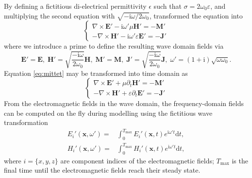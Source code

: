 \documentclass[a4paper,10pt]{article}
\begin{document}
By defining a fictitious di-electrical permittivity $\epsilon$ such that $\sigma = 2\omega_0 \varepsilon$, and multiplying the second equation with $\sqrt{-\mathrm{i}\omega/2\omega_0}$, \citep{Mittet_2010_HFD}  transformed the equation into
\begin{equation}\label{eq:mittet}
\begin{cases}
\nabla\times \mathbf{E}'-\mathrm{i}\omega'\mu \mathbf{H}' = -\mathbf{M}'\\
-\nabla\times\mathbf{H}'-\mathrm{i}\omega'\varepsilon \mathbf{E}' = -\mathbf{J}'
\end{cases} 
\end{equation}
where we introduce a prime to define the resulting wave domain fields via
\begin{equation}\label{eq:correspondence}
    \mathbf{E}'=\mathbf{E},\;
    \mathbf{H}'= \sqrt{\frac{-\mathrm{i}\omega}{2\omega_0}} \mathbf{H},\;
    \mathbf{M}'= \mathbf{M},\;
    \mathbf{J}'= \sqrt{\frac{-\mathrm{i}\omega}{2\omega_0}} \mathbf{J},\;
    \omega' = (1+\mathrm{i})\sqrt{\omega\omega_0}.
\end{equation}
Equation \eqref{eq:mittet} may be transformed into time domain as
\begin{equation}
\begin{cases}
\nabla\times \mathbf{E}' + \mu\partial_t \mathbf{H}' = -\mathbf{M}'\\
-\nabla\times \mathbf{H}' + \varepsilon\partial_t \mathbf{E}' = -\mathbf{J}'
\end{cases}
\end{equation}
From the electromagnetic fields in the wave domain, the frequency-domain fields can be computed on
the fly during modelling using the fictitious wave transformation
%
\begin{subequations}\label{eq:transform}
  \begin{align}
E_i'(\mathbf{x},\omega') =& \int_0^{T_{\max}} E_i'(\mathbf{x},t)e^{\mathrm{i}\omega't} \mathrm{d}t,\\
H_i'(\mathbf{x},\omega') =& \int_0^{T_{\max}} H_i'(\mathbf{x},t)e^{\mathrm{i}\omega't} \mathrm{d}t,
\end{align}
\end{subequations}
%
where $i=\{x,y,z\}$ are component indices of the electromagnetic fields; $T_{\max}$ is the final time until the electromagnetic fields reach their steady state.
\end{document}
